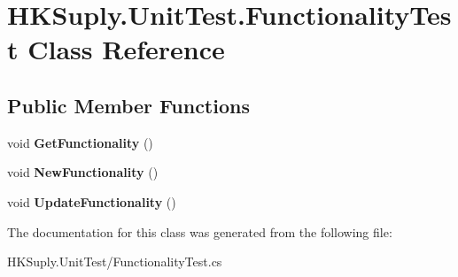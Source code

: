 \hypertarget{class_h_k_suply_1_1_unit_test_1_1_functionality_test}{}\section{H\+K\+Suply.\+Unit\+Test.\+Functionality\+Test Class Reference}
\label{class_h_k_suply_1_1_unit_test_1_1_functionality_test}
\subsection*{Public Member Functions}
\begin{DoxyCompactItemize}
\item 
\mbox{\label{class_h_k_suply_1_1_unit_test_1_1_functionality_test_a7c1c4dbb73d76537cee7110a85011bdb}} 
void {\bfseries Get\+Functionality} ()
\item 
\mbox{\label{class_h_k_suply_1_1_unit_test_1_1_functionality_test_ac8505a9a8bb7353e45e84ab7ee68c8fb}} 
void {\bfseries New\+Functionality} ()
\item 
\mbox{\label{class_h_k_suply_1_1_unit_test_1_1_functionality_test_a7c1c86aff37c2c7d23c8c48e10df6425}} 
void {\bfseries Update\+Functionality} ()
\end{DoxyCompactItemize}


The documentation for this class was generated from the following file\+:\begin{DoxyCompactItemize}
\item 
H\+K\+Suply.\+Unit\+Test/Functionality\+Test.\+cs\end{DoxyCompactItemize}
